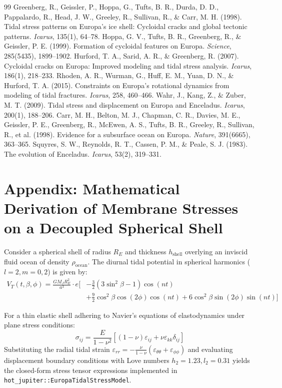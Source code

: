 \documentclass[11pt,a4paper]{article}
\begin{document}
\begin{thebibliography}{99}
 Greenberg, R., Geissler, P., Hoppa, G., Tufts, B. R., Durda, D. D., Pappalardo, R., Head, J. W., Greeley, R., Sullivan, R., \& Carr, M. H. (1998). Tidal stress patterns on Europa's ice shell: Cycloidal cracks and global tectonic patterns. \textit{Icarus}, 135(1), 64--78.
 Hoppa, G. V., Tufts, B. R., Greenberg, R., \& Geissler, P. E. (1999). Formation of cycloidal features on Europa. \textit{Science}, 285(5435), 1899--1902.
 Hurford, T. A., Sarid, A. R., \& Greenberg, R. (2007). Cycloidal cracks on Europa: Improved modeling and tidal stress analysis. \textit{Icarus}, 186(1), 218--233.
 Rhoden, A. R., Wurman, G., Huff, E. M., Yuan, D. N., \& Hurford, T. A. (2015). Constraints on Europa's rotational dynamics from modeling of tidal fractures. \textit{Icarus}, 258, 460--466.
 Wahr, J., Kang, Z., \& Zuber, M. T. (2009). Tidal stress and displacement on Europa and Enceladus. \textit{Icarus}, 200(1), 188--206.
 Carr, M. H., Belton, M. J., Chapman, C. R., Davies, M. E., Geissler, P. E., Greenberg, R., McEwen, A. S., Tufts, B. R., Greeley, R., Sullivan, R., et al. (1998). Evidence for a subsurface ocean on Europa. \textit{Nature}, 391(6665), 363--365.
 Squyres, S. W., Reynolds, R. T., Cassen, P. M., \& Peale, S. J. (1983). The evolution of Enceladus. \textit{Icarus}, 53(2), 319--331.
\end{thebibliography}

\appendix
\section{Appendix: Mathematical Derivation of Membrane Stresses on a Decoupled Spherical Shell}
Consider a spherical shell of radius $R_E$ and thickness $h_{\mathrm{shell}}$ overlying an inviscid fluid ocean of density $\rho_{\mathrm{ocean}}$. The diurnal tidal potential in spherical harmonics ($l=2, m=0, 2$) is given by:
\begin{align}
V_T(t, \beta, \phi) = \frac{G M_J R_E^2}{a^3} \cdot e \Big[ &-\frac{3}{2}(3\sin^2\beta - 1)\cos(nt) \nonumber \\
&+ \frac{9}{2}\cos^2\beta\cos(2\phi)\cos(nt) + 6\cos^2\beta\sin(2\phi)\sin(nt) \Big]
\end{align}

For a thin elastic shell adhering to Navier's equations of elastodynamics under plane stress conditions:
\begin{equation}
\sigma_{ij} = \frac{E}{1 - \nu^2} \left[ (1-\nu)\varepsilon_{ij} + \nu \varepsilon_{kk} \delta_{ij} \right]
\end{equation}
Substituting the radial tidal strain $\varepsilon_{rr} = -\frac{\nu}{1-\nu}(\varepsilon_{\theta\theta} + \varepsilon_{\phi\phi})$ and evaluating displacement boundary conditions with Love numbers $h_2 = 1.23, l_2 = 0.31$ yields the closed-form stress tensor expressions implemented in \texttt{hot\_jupiter::EuropaTidalStressModel}.
\end{document}
